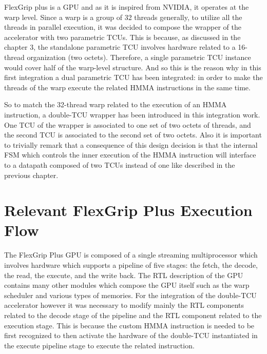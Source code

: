 
FlexGrip plus is a GPU and as it is inspired from NVIDIA, it operates at the warp level. Since a warp is a group of 32 threads generally, to utilize all the threads in parallel execution, it was decided to compose the wrapper of the accelerator with two parametric TCUs. This is because, as discussed in the chapter 3, the standalone parametric TCU involves hardware related to a 16-thread organization (two octets). Therefore, a single parametric TCU instance would cover half of the warp-level structure. And so this is the reason why in this first integration a dual parametric TCU has been integrated: in order to make the threads of the warp execute the related HMMA instructions in the same time.

So to match the 32-thread warp related to the execution of an HMMA instruction, a double-TCU wrapper has been introduced in this integration work. One TCU of the wrapper is associated to one set of two octets of threads, and the second TCU is associated to the second set of two octets. Also it is important to trivially remark that a consequence of this design decision is that the internal FSM which controls the inner execution of the HMMA instruction will interface to a datapath composed of two TCUs instead of one like described in the previous chapter.

\section{Relevant FlexGrip Plus Execution Flow}


The FlexGrip Plus GPU is composed of a single streaming multiprocessor which involves hardware which supports a pipeline of five stages: the fetch, the decode, the read, the execute, and the write back. The RTL description of the GPU contains many other modules which compose the GPU itself such as the warp scheduler and various types of memories. For the integration of the double-TCU accelerator however it was necessary to modify mainly the RTL components related to the decode stage of the pipeline and the RTL component related to the execution stage. This is because the custom HMMA instruction is needed to be first recognized to then activate the hardware of the double-TCU instantiated in the execute pipeline stage to execute the related instruction. 

